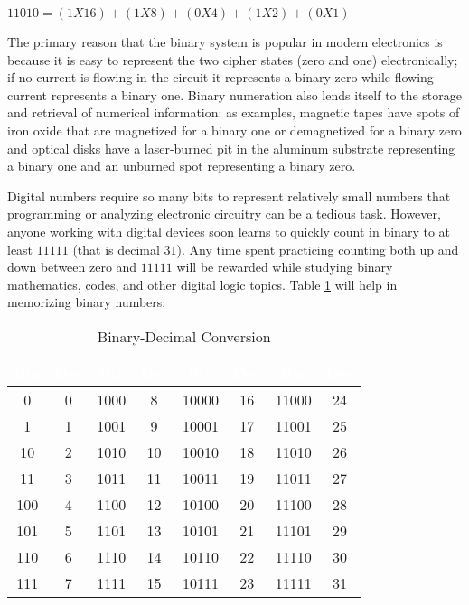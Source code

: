\begin{center}
  $ 11010 = (1 X 16) + (1 X 8) + (0 X 4) + (1 X 2) + (0 X 1) $
\end{center}

The primary reason that the binary system is popular in modern electronics is because it is easy to represent the two cipher states (zero and one) electronically; if no current is flowing in the circuit it represents a binary zero while flowing current represents a binary one. Binary numeration also lends itself to the storage and retrieval of numerical information: as examples, magnetic tapes have spots of iron oxide that are magnetized for a binary one or demagnetized for a binary zero and optical disks have a laser-burned pit in the aluminum substrate representing a binary one and an unburned spot representing a binary zero.

Digital numbers require so many bits to represent relatively small numbers that programming or analyzing electronic circuitry can be a tedious task. However, anyone working with digital devices soon learns to quickly count in binary to at least $ 11111 $ (that is decimal $ 31 $). Any time spent practicing counting both up and down between zero and $ 11111 $ will be rewarded while studying binary mathematics, codes, and other digital logic topics. Table \ref{MF:tab:bin_dec_conversion} will help in memorizing binary numbers:

\begin{table}[H]
  \sffamily
  \newcommand{\head}[1]{\textcolor{white}{\textbf{#1}}}
  \begin{center}
    \begin{tabular}{|cc|cc|cc|cc|} 
      \hline
      \rowcolor{black!75}
      \head{Bin} & \head{Dec} & \head{Bin} & \head{Dec} & \head{Bin} & 
      \head{Dec} & \head{Bin} & \head{Dec} \\
      \hline 
      0   & 0 & 1000 & 8  & 10000 & 16 & 11000 & 24 \\ 
      1   & 1 & 1001 & 9  & 10001 & 17 & 11001 & 25 \\ 
      10  & 2 & 1010 & 10 & 10010 & 18 & 11010 & 26 \\ 
      11  & 3 & 1011 & 11 & 10011 & 19 & 11011 & 27 \\ 
      100 & 4 & 1100 & 12 & 10100 & 20 & 11100 & 28 \\ 
      101 & 5 & 1101 & 13 & 10101 & 21 & 11101 & 29 \\ 
      110 & 6 & 1110 & 14 & 10110 & 22 & 11110 & 30 \\ 
      111 & 7 & 1111 & 15 & 10111 & 23 & 11111 & 31 \\ 
      \hline
    \end{tabular} 
  \end{center}
  \caption{Binary-Decimal Conversion}
  \label{MF:tab:bin_dec_conversion}
\end{table}

